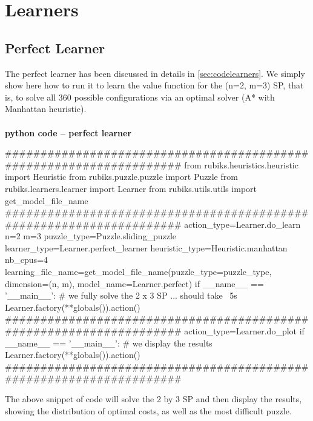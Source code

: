 \section{Learners}


\subsection{Perfect Learner}
\label{PLSS}

The perfect learner has been discussed in details in \ref{sec:codelearners}. We simply show here how to run it to learn the value function for the (n=2, m=3) SP, that is, to solve all 360 possible configurations via an optimal solver (A{*} with Manhattan heuristic).


\afblue
\paragraph{}{\textbf{python code -- perfect learner}}
\begin{python}
####################################################################
from rubiks.heuristics.heuristic import Heuristic
from rubiks.puzzle.puzzle import Puzzle
from rubiks.learners.learner import Learner
from rubiks.utils.utils import get_model_file_name
####################################################################
action_type=Learner.do_learn
n=2
m=3
puzzle_type=Puzzle.sliding_puzzle
learner_type=Learner.perfect_learner
heuristic_type=Heuristic.manhattan
nb_cpus=4
learning_file_name=get_model_file_name(puzzle_type=puzzle_type,
                                       dimension=(n, m),
                                       model_name=Learner.perfect)
if __name__ == '__main__':
    # we fully solve the 2 x 3 SP ... should take ~5s
    Learner.factory(**globals()).action()
####################################################################
action_type=Learner.do_plot
if __name__ == '__main__':
    # we display the results
    Learner.factory(**globals()).action()
####################################################################
\end{python}
\black
The above snippet of code will solve the 2 by 3 SP and then display the results, showing the distribution of optimal costs, as well as the most difficult puzzle.

